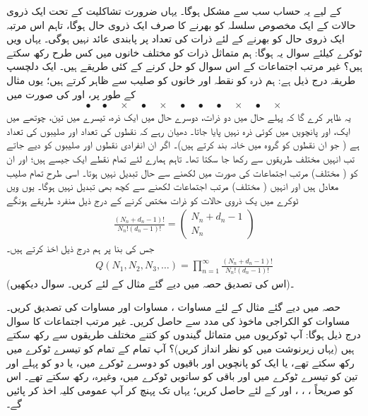   کے لیے یہ حساب سب سے مشکل ہوگا۔ یہاں ضرورت تشاکلیت کے تحت ایک ذروی حالات کے ایک مخصوص سلسلہ کو بھرنے کا صرف ایک  ذروی حال ہوگا، تاہم اس مرتبہ ایک ذروی حال کو بھرنے کے لئے ذرات کی تعداد پر پابندی عائد نہیں ہوگی۔ یہاں  ویں ٹوکرے کیلئے سوال یہ ہوگا: ہم متماثل  ذرات کو  مختلف خانوں میں کس طرح رکھ سکتے ہیں؟ غیر مرتب اجتماعات کے اس سوال کو حل کرنے کے کئی طریقے ہیں۔ ایک دلچسپ طریقہ درج ذیل ہے: ہم ذرہ کو نقطہ اور خانوں کو صلیب سے ظاہر کرتے ہیں؛ یوں مثال کے طور پر،  اور  کی صورت میں
\begin{align*} 
\bullet \quad \bullet \quad \times \quad \bullet \quad \times \quad \bullet \quad \bullet \quad \bullet \quad \times \quad \bullet \quad \times
\end{align*}
یہ ظاہر کرے گا کہ پہلے حال میں دو ذرات، دوسرے حال میں ایک ذرہ، تیسرے میں تین، چوتھے میں ایک، اور پانچویں میں کوئی ذرہ نہیں پایا جاتا۔ دھیان رہے کہ نقطوں کی تعداد  اور صلیبوں کی تعداد  ہے ( جو ان نقطوں کو  گروہ میں خانہ بند کرتے ہیں)۔ اگر ان انفرادی نقطوں اور صلیبوں کو  دیے جاتے تب انہیں  مختلف طریقوں سے رکھا جا سکتا تھا۔ تاہم ہمارے لئے تمام نقطے ایک جیسے ہیں؛ اور ان کو ( مختلف) مرتب اجتماعات کی صورت میں لکھنے سے حال تبدیل نہیں ہوتا۔ اسی طرح تمام صلیب معادل ہیں اور انہیں (  مختلف) مرتب اجتماعات لکھنے سے کچھ بھی تبدیل نہیں ہوگا۔ یوں  ویں ٹوکرے میں  یک ذروی حالات کو  ذرات مختص کرنے کے درج ذیل منفرد طریقے ہونگے 
\begin{align}\label{مساوات_متماثل_بوسن_درمیانہ_اجتماعات}
\frac{(N_n + d_n - 1) !}{N_n ! (d_n - 1) !} = 
\begin{pmatrix}
N_n + d_n - 1 \\
N_n
\end{pmatrix}
\end{align}
جس کی بنا پر ہم درج ذیل اخذ کرتے ہیں۔ 
\begin{align}\label{مساوات_متماثل_بوسن_اجتماعات}
Q(N_1 , N_2 , N_3 , \dotsc) = \prod_{n = 1}^{\infty} \frac{(N_n + d_n - 1) !}{N_n ! (d_n - 1) !}
\end{align}
(اس کی تصدیق حصہ  میں دیے گئے مثال کے لئے کریں۔ سوال  دیکھیں)۔


حصہ  میں دیے گئے مثال کے لئے مساوات ، مساوات  اور مساوات  کی تصدیق کریں۔ 
مساوات  کو الكراجى ماخوذ کی مدد سے حاصل کریں۔ غیر مرتب اجتماعات کا سوال درج ذیل ہوگا: آپ  ٹوکریوں میں  متماثل گیندوں کو کتنے مختلف طریقوں سے رکھ سکتے ہیں (یہاں زیرنوشت میں  کو نظر انداز کریں)؟ آپ تمام کے تمام  کو تیسرے ٹوکرے میں رکھ سکتے تھے، یا ایک کو پانچویں اور باقیوں کو دوسرے ٹوکرے میں، یا دو کو پہلے اور تین کو تیسرے ٹوکرے میں اور باقی کو ساتویں ٹوکرے میں، وغیرہ، رکھ سکتے تھے۔ اس کو صریحاً ، ، ، اور کے لئے حاصل کریں؛ یہاں تک پہنچ کر آپ عمومی کلیہ اخذ کر پائیں گے۔ 



